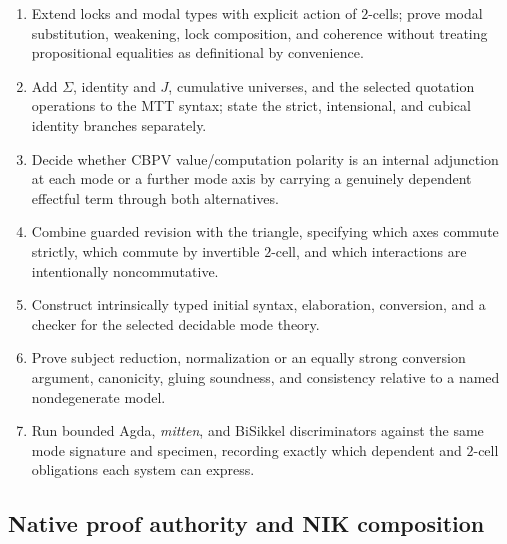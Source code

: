 \documentclass[11pt]{article}
\theoremstyle{definition}
\theoremstyle{remark}
\begin{document}
\begin{enumerate}
  transport preservation for $\Sigma$, restricted $\Pi$, and extensional
  identity are checked.  Pairing, both projections, lambda, application, and
  extensional reflexivity commute through the same comparison.  The
  category-indexed proof-relevant CwF now independently supports the same
  $\Sigma$/extensional-identity/restricted-$\Pi$ boundary, including its
  groupoid positive case and directed representable counterexample.  Prove
  intrinsic $J$ and universe closure; connect both doctrines and their
  operations to the MTT lock syntax; and carry the rho and graph specimens
  through them.  Add a
  pushforward only if a named consumer needs one; arbitrary-family lossless
  descent is already ruled out.
\item Extend locks and modal types with explicit action of $2$-cells; prove
  modal substitution, weakening, lock composition, and coherence without
  treating propositional equalities as definitional by convenience.
\item Add $\Sigma$, identity and $J$, cumulative universes, and the selected
  quotation operations to the MTT syntax; state the strict, intensional, and
  cubical identity branches separately.
\item Decide whether CBPV value/computation polarity is an internal adjunction
  at each mode or a further mode axis by carrying a genuinely dependent
  effectful term through both alternatives.
\item Combine guarded revision with the triangle, specifying which axes commute
  strictly, which commute by invertible $2$-cell, and which interactions are
  intentionally noncommutative.
\item Construct intrinsically typed initial syntax, elaboration, conversion,
  and a checker for the selected decidable mode theory.
\item Prove subject reduction, normalization or an equally strong conversion
  argument, canonicity, gluing soundness, and consistency relative to a named
  nondegenerate model.
\item Run bounded Agda, \emph{mitten}, and BiSikkel discriminators against the
  same mode signature and specimen, recording exactly which dependent and
  $2$-cell obligations each system can express.
\end{enumerate}

\subsection{Native proof authority and NIK composition}
\end{document}
